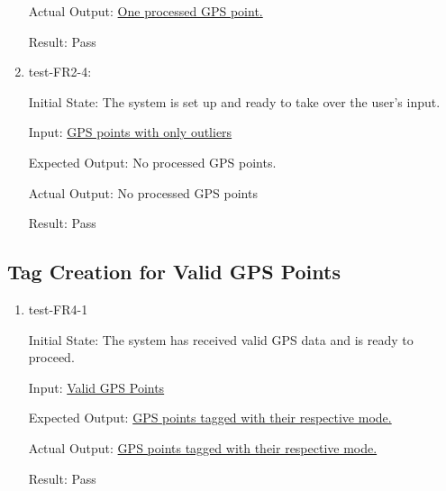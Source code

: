 \documentclass[12pt, titlepage]{article}
\begin{document}
\begin{enumerate}
    Actual Output: \href{https://github.com/paezha/PyERT-BLACK/blob/rev0-test/test/test_data/fr-tests/fr2-3-out.csv}{One processed GPS point.}
    
    Result: Pass
    \item test-FR2-4:\label{test-FR2-4}
    
    Initial State: The system is set up and ready to take over the user’s input.
    
    Input: \href{https://github.com/paezha/PyERT-BLACK/blob/rev0-test/quarto-example/data/sample-gps/sample-gps-8.csv}{GPS points with only outliers}
    
    Expected Output: No processed GPS points.
    
    Actual Output: No processed GPS points
    
    Result: Pass
\end{enumerate}

\subsection{Tag Creation for Valid GPS Points}
\begin{enumerate}
    \item test-FR4-1\label{test-FR4-1}
    
    Initial State: The system has received valid GPS data and is ready to proceed.
    
    Input: \href{https://github.com/paezha/PyERT-BLACK/blob/rev0-test/quarto-example/data/sample-gps/sample-gps-1.csv}{Valid GPS Points}
    
    Expected Output: \href{https://github.com/paezha/PyERT-BLACK/blob/rev0-test/test/test_data/fr-tests/fr4-1-expected.csv}{GPS points tagged with their respective mode.}
    
    Actual Output: \href{https://github.com/paezha/PyERT-BLACK/blob/rev0-test/test/test_data/fr-tests/fr4-1-out.csv}{GPS points tagged with their respective mode.}
    
    Result: Pass
\end{enumerate}
\end{document}
